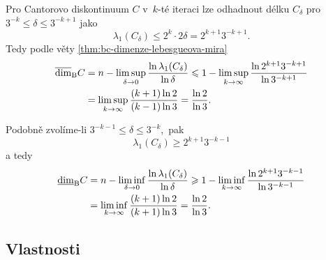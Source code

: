 \begin{example}
    Pro Cantorovo diskontinuum $C$ v~$k$-té iteraci lze odhadnout délku $C_\delta$ pro $3^{-k}\leqslant\delta\leqslant 3^{-k+1}$ jako
    \[\lambda_1(C_\delta)\leqslant2^k\cdot 2\delta=2^{k+1}3^{-k+1}.\]
    Tedy podle věty \ref{thm:bc-dimenze-lebesgueova-mira}
    \begin{align*}
        \overline{\dim}_\textup{B}{C}&=n-\limsup_{\delta\to 0}\dfrac{\ln{\lambda_1(C_\delta)}}{\ln{\delta}}\leqslant1-\limsup_{k\to\infty}\dfrac{\ln{2^{k+1}3^{-k+1}}}{\ln{3^{-k+1}}}\\
        &=\limsup_{k\to\infty}\dfrac{(k+1)\ln{2}}{(k-1)\ln{3}}=\dfrac{\ln{2}}{\ln{3}}.
    \end{align*}

    Podobně zvolíme-li $3^{-k-1}\leqslant\delta\leqslant 3^{-k}$,~pak
    \[\lambda_1(C_\delta)\geqslant 2^{k+1}3^{-k-1}\]
    a tedy
    \begin{align*}
        \underline{\dim}_\textup{B}{C}&=n-\liminf_{\delta\to 0}\dfrac{\ln{\lambda_1(C_\delta)}}{\ln{\delta}}\geqslant 1-\liminf_{k\to\infty}\dfrac{\ln{2^{k+1}3^{-k-1}}}{\ln{3^{-k-1}}}\\
        &=\liminf_{k\to\infty}\dfrac{(k+1)\ln{2}}{(k+1)\ln{3}}=\dfrac{\ln{2}}{\ln{3}}.
    \end{align*}
\end{example}

\subsection{Vlastnosti}\label{subsec:vlastnosti-bc-dimenze}

